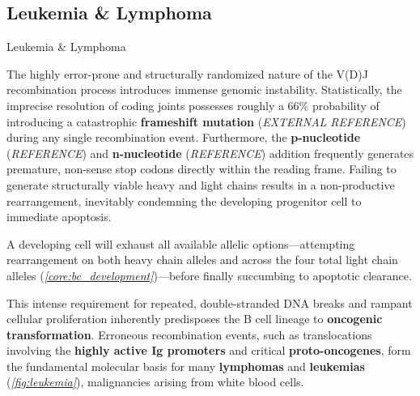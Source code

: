   \subsection{Leukemia \& Lymphoma}
    
    \begin{core}{Leukemia \& Lymphoma}

      The highly error-prone and structurally randomized nature of the V(D)J recombination process introduces immense genomic instability. Statistically, the imprecise resolution of coding joints possesses roughly a 66\% probability of introducing a catastrophic \textbf{frameshift mutation} (\textit{EXTERNAL REFERENCE}) during any single recombination event. Furthermore, the \textbf{p-nucleotide} (\textit{REFERENCE}) and \textbf{n-nucleotide} (\textit{REFERENCE}) addition frequently generates premature, non-sense stop codons directly within the reading frame. Failing to generate structurally viable heavy and light chains results in a non-productive rearrangement, inevitably condemning the developing progenitor cell to immediate apoptosis.

      A developing cell will exhaust all available allelic options---attempting rearrangement on both heavy chain alleles and across the four total light chain alleles (\textit{\autoref{core:bc_development}})---before finally succumbing to apoptotic clearance.

      This intense requirement for repeated, double-stranded DNA breaks and rampant cellular proliferation inherently predisposes the B cell lineage to \textbf{oncogenic transformation}. Erroneous recombination events, such as translocations involving the \textbf{highly active Ig promoters} and critical \textbf{proto-oncogenes}, form the fundamental molecular basis for many \textbf{lymphomas} and \textbf{leukemias} (\textit{\autoref{fig:leukemia}}), malignancies arising from white blood cells.


    \end{core}


